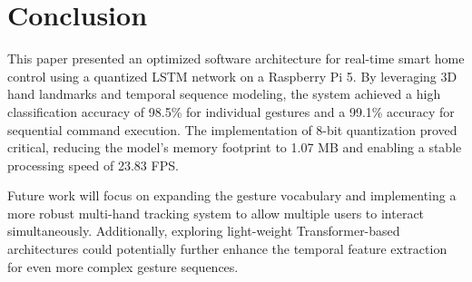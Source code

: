 \section{Conclusion}
This paper presented an optimized software architecture for real-time smart home control using a quantized LSTM network on a Raspberry Pi 5. By leveraging 3D hand landmarks and temporal sequence modeling, the system achieved a high classification accuracy of 98.5\% for individual gestures and a 99.1\% accuracy for sequential command execution. The implementation of 8-bit quantization proved critical, reducing the model's memory footprint to 1.07 MB and enabling a stable processing speed of 23.83 FPS.

Future work will focus on expanding the gesture vocabulary and implementing a more robust multi-hand tracking system to allow multiple users to interact simultaneously. Additionally, exploring light-weight Transformer-based architectures could potentially further enhance the temporal feature extraction for even more complex gesture sequences.